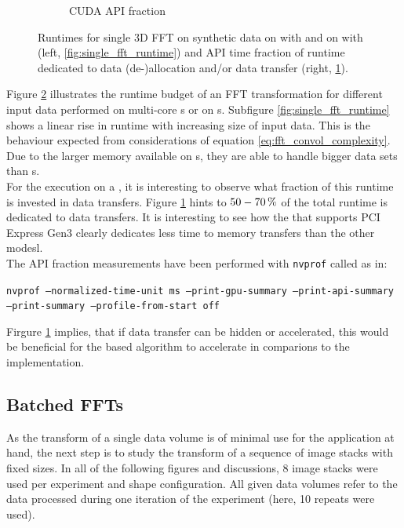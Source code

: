 \begin{figure}[h]
\begin{subfigure}[b]{0.45\textwidth}
    \caption{CUDA API fraction}
    \label{fig:single_fft_api_fraction}
  \end{subfigure}
  \hfill
  \caption{Runtimes for single 3D FFT on synthetic data on \cpu{} with \fftw{} and on \gpu{} with \cufft{} (left, \ref{fig:single_fft_runtime}) and API time fraction of runtime dedicated to data (de-)allocation and/or data transfer (right, \ref{fig:single_fft_api_fraction}).}
  \label{fig:rt_single_fft}
\end{figure}

Figure \ref{fig:rt_single_fft} illustrates the runtime budget of an FFT transformation for different input data performed on multi-core \cpu{}s or on \gpu{}s. Subfigure \ref{fig:single_fft_runtime} shows a linear rise in runtime with increasing size of input data. This is the behaviour expected from considerations of equation \ref{eq:fft_convol_complexity}. Due to the larger memory available on \cpu{}s, they are able to handle bigger data sets than \gpu{}s.\\

For the execution on a \gpu{}, it is interesting to observe what fraction of this runtime is invested in data transfers. Figure \ref{fig:single_fft_api_fraction} hints to $\unit[50-70]{\%}$ of the total runtime is dedicated to data transfers. It is interesting to see how the \gpu{} that supports PCI Express Gen3 clearly dedicates less time to memory transfers than the other modesl. \\

The API fraction measurements have been performed with \texttt{nvprof} called as in:\newline
\begin{center}
  \texttt{nvprof --normalized-time-unit ms --print-gpu-summary --print-api-summary --print-summary --profile-from-start off}\newline
\end{center}

Firgure \ref{fig:single_fft_api_fraction} implies, that if data transfer can be hidden or accelerated, this would be beneficial for the \gpu{} based algorithm to accelerate in comparions to the \cpu{} implementation.

\clearpage
\subsection{Batched FFTs}
As the transform of a single data volume is of minimal use for the application at hand, the next step is to study the transform of a sequence of image stacks with fixed sizes. In all of the following figures and discussions, 8 image stacks were used per experiment and shape configuration. All given data volumes refer to the data processed during one iteration of the experiment (here, 10 repeats were used). \newline
 
